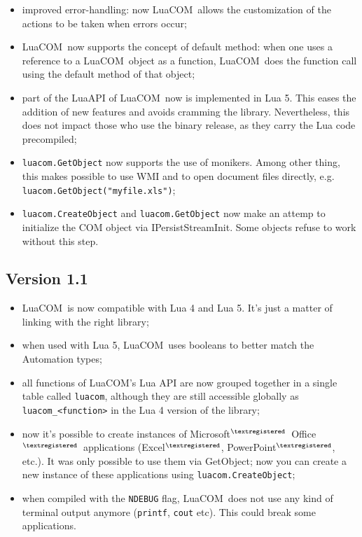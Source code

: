\documentclass[11pt,a4paper,english]{report}
\newcommand{\ident}[1]{\mbox{\texttt{#1}}}
\newcommand{\techname}[1]{\mbox{#1}}
\newcommand{\lua}{\techname{Lua}}
\newcommand{\luacom}{\techname{LuaCOM}}
\newcommand{\registered}{$^{\textregistered}$}
\begin{document}
\begin{itemize}
\item improved error-handling: now \luacom\ allows the customization
of the actions to be taken when errors occur;

\item \luacom\ now supports the concept of default method: when one
uses a reference to a \luacom\ object as a function, \luacom\ does the
function call using the default method of that object;

\item part of the \lua API of \luacom\ now is implemented
in Lua 5. This eases the addition of new features and avoids
cramming the library. Nevertheless, this does not impact those who use
the binary release, as they carry the Lua code precompiled;

\item \ident{luacom.GetObject} now supports the use of monikers. Among
other thing, this makes possible to use WMI and to open document files
directly, e.g. \verb+luacom.GetObject("myfile.xls")+;

\item \ident{luacom.CreateObject} and \ident{luacom.GetObject} now
make an attemp to initialize the COM object via
IPersistStreamInit. Some objects refuse to work without this step.

\end{itemize}

\subsection*{Version 1.1}

\begin{itemize}
\item \luacom\ is now compatible with Lua 4 and Lua 5. It's just a
matter of linking with the right library;

\item when used with Lua 5, \luacom\ uses booleans to better match the
Automation types;

\item all functions of \luacom's Lua API are now grouped together in a
single table called \verb+luacom+, although they are still accessible
globally as \texttt{luacom\_<function>} in the Lua 4 version of the
library;

\item now it's possible to create instances of Microsoft\registered\
Office\registered\ applications (Excel\registered, PowerPoint\registered,
etc.). It was only possible to use them via GetObject; now you can
create a new instance of these applications using
\texttt{luacom.CreateObject};

\item when compiled with the \texttt{NDEBUG} flag, \luacom\ does not
use any kind of terminal output anymore (\texttt{printf},
\texttt{cout} etc). This could break some applications.

\end{itemize}
\end{document}
